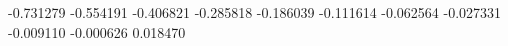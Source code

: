 -0.731279
-0.554191
-0.406821
-0.285818
-0.186039
-0.111614
-0.062564
-0.027331
-0.009110
-0.000626
0.018470
